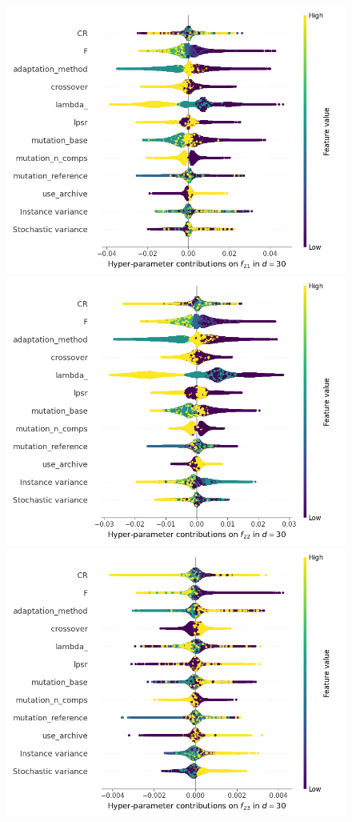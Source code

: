 \begin{figure}[t]
	\includegraphics[height=0.15\textheight,trim=0mm 0mm 30mm 0mm,clip]{de_img_new/img_summary_f21_d30.png}
	\includegraphics[height=0.15\textheight,trim=60mm 0mm 30mm 0mm,clip]{de_img_new/img_summary_f22_d30.png}
	\includegraphics[height=0.15\textheight,trim=60mm 0mm 30mm 0mm,clip]{de_img_new/img_summary_f23_d30.png}

\end{figure}
